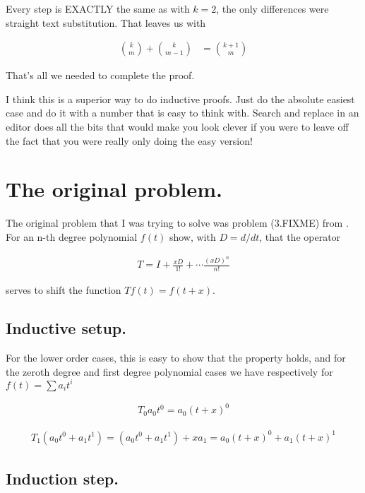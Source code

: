 Every step is EXACTLY the same as with $k=2$, the only differences were straight text substitution.  That leaves us with

\begin{align}
\binom{k}{m} + \binom{k}{m-1} 
&=
\binom{k+1}{m}
\end{align}

That's all we needed to complete the proof.

I think this is a superior way to do inductive proofs.  Just do the absolute easiest case and do it with a number that is easy to think with.  Search and replace in an editor does all the bits that would make you look clever if you were to leave off the fact that you were really only doing the easy version!

\section{The original problem. }

The original problem that I was trying to solve was problem (3.FIXME) from \cite{byron1992mca}.  For an n-th degree polynomial $f(t)$
show, with $D = d/dt$, that the operator

\begin{align*}
T = I + \frac{xD}{1!} + \cdots \frac{(xD)^n}{n!}
\end{align*}

serves to shift the function $T f(t) = f(t + x)$.

\subsection{Inductive setup. }

For the lower order cases, this is easy to show that the property holds, and for the zeroth degree and first degree polynomial cases we have
respectively for $f(t) = \sum a_i t^i$

\begin{align*}
T_0 a_0 t^0 = a_0 (t + x)^0
\end{align*}

\begin{align*}
T_1 (a_0 t^0 + a_1 t^1) = (a_0 t^0 + a_1 t^1) + x a_1 = a_0(t + x)^0 + a_1(t + x)^1
\end{align*}

\subsection{Induction step. }

